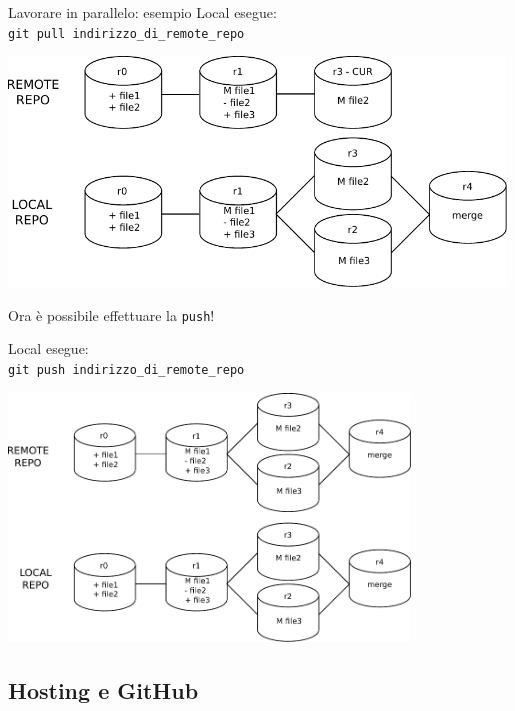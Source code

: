 \documentclass[xcolor=dvipsnames,presentation]{beamer}
\begin{document}
\begin{frame}{Lavorare in parallelo: esempio}
	Local esegue:\\
	\texttt{git pull indirizzo\_di\_remote\_repo} \\
	\begin{center}
		\includegraphics[width=0.99\textwidth]{img/draw9}
	\end{center}
	Ora è possibile effettuare la \texttt{push}!
	\framebreak{}

	Local esegue:\\
	\texttt{git push indirizzo\_di\_remote\_repo} \\
	\begin{center}
		\includegraphics[width=0.8\textwidth]{img/draw10}
	\end{center}
\end{frame}

\subsection{Hosting e GitHub}

\end{document}
